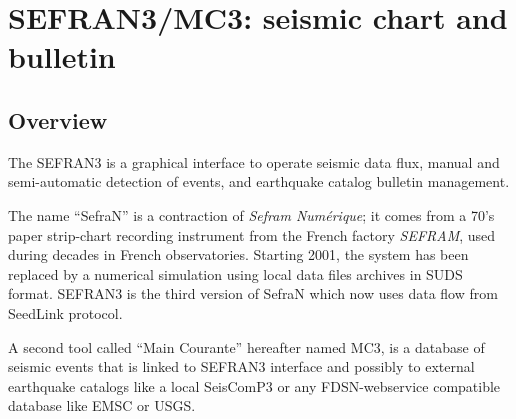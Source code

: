


\section{SEFRAN3/MC3: seismic chart and bulletin}

\subsection{Overview}

The SEFRAN3 is a graphical interface to operate seismic data flux, manual and semi-automatic detection of events, and earthquake catalog bulletin management.

The name ``SefraN'' is a contraction of \textit{Sefram Numérique}; it comes from a 70's paper strip-chart recording instrument from the French factory \textit{SEFRAM\textregistered}, used during decades in French observatories. Starting 2001, the system has been replaced by a numerical simulation using local data files archives in SUDS format. SEFRAN3 is the third version of SefraN which now uses data flow from SeedLink protocol.

A second tool called ``Main Courante'' hereafter named MC3, is a database of seismic events that is linked to SEFRAN3 interface and possibly to external earthquake catalogs like a local SeisComP3 or any FDSN-webservice compatible database like EMSC or USGS.

